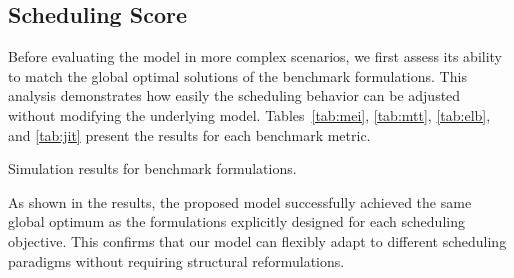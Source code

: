 \documentclass[12pt]{article}
\begin{document}





\subsection*{Scheduling Score}

Before evaluating the model in more complex scenarios, we first assess its ability to match the global optimal solutions of the benchmark formulations. This analysis demonstrates how easily the scheduling behavior can be adjusted without modifying the underlying model. Tables~\ref{tab:mei}, \ref{tab:mtt}, \ref{tab:elb}, and \ref{tab:jit} present the results for each benchmark metric.

\begin{table}[h]
    \centering
    \caption{Simulation results for benchmark formulations.}
    \label{tab:benchmark_results}
\end{table}

As shown in the results, the proposed model successfully achieved the same global optimum as the formulations explicitly designed for each scheduling objective. This confirms that our model can flexibly adapt to different scheduling paradigms without requiring structural reformulations.
\end{document}
